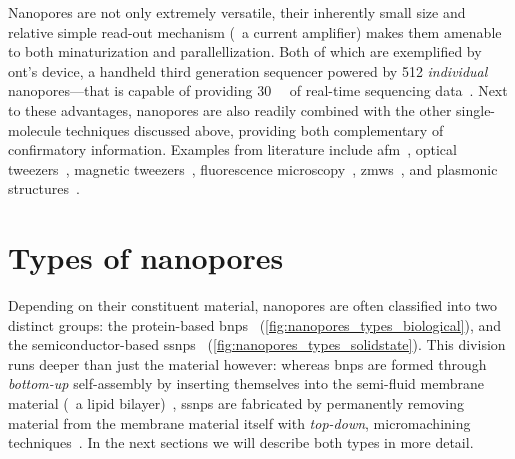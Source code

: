 Nanopores are not only extremely versatile, their inherently small size and relative simple read-out mechanism
(\ie~a current amplifier) makes them amenable to both minaturization and parallellization. Both of which are
exemplified by \gls{ont}'s  device, a handheld third generation sequencer powered by \num{512}
\emph{individual} nanopores---that is capable of providing \SI{30}{\giga\bp} of real-time sequencing
data~\cite{ONT-2020}. Next to these advantages, nanopores are also readily combined with the other
single-molecule techniques discussed above, providing both complementary of confirmatory information. Examples
from literature include \gls{afm}~\cite{Aramesh-2019}, optical
tweezers~\cite{Keyser-2006,vanDorp-2009,Hall-2009,Galla-2014}, magnetic tweezers~\cite{Peng-2009},
fluorescence microscopy~\cite{McNally-2010,Anderson-2014,Assad-2014,Huang-2015},
\glspl{zmw}~\cite{Auger-2014,Larkin-2017,Spitzberg-2019}, and plasmonic
structures~\cite{Im-2010,Chen-2018,Verschueren-2018,Garoli-2019}.


%
%
\section{Types of nanopores}
%
\label{sec:np:types}
%

Depending on their constituent material, nanopores are often classified into two distinct groups: the
protein-based \glspl{bnp}~\cite{Willems-VanMeervelt-2017} (\cref{fig:nanopores_types_biological}), and the
semiconductor-based \glspl{ssnp}~\cite{Dekker-2007} (\cref{fig:nanopores_types_solidstate}). This division
runs deeper than just the material however: whereas \glspl{bnp} are formed through \emph{bottom-up}
self-assembly by inserting themselves into the semi-fluid membrane material (\eg~a lipid
bilayer)~\cite{Howorka-2017}, \glspl{ssnp} are fabricated by permanently removing material from the membrane
material itself with \emph{top-down}, micromachining techniques~\cite{Dekker-2007}. In the next sections we
will describe both types in more detail.



